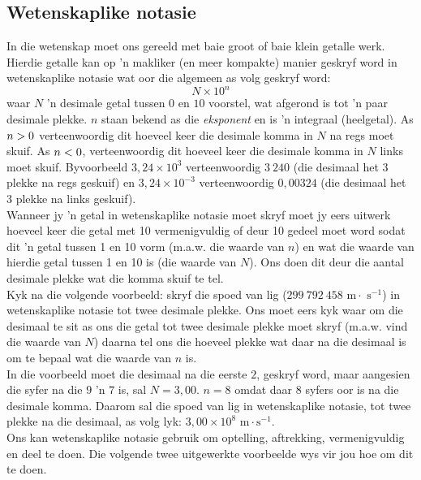 \subsection*{Wetenskaplike notasie}
In die wetenskap moet ons gereeld met baie groot of baie klein getalle werk. Hierdie getalle kan op  'n makliker (en meer kompakte) manier geskryf word in wetenskaplike notasie wat oor die algemeen as volg geskryf word:      
    \begin{equation*}
    N \times 10^{n}
      \end{equation*}
waar $N$  'n desimale getal tussen $0$ en $10$ voorstel, wat afgerond is tot  'n paar desimale plekke. $n$ staan bekend as die \textsl{eksponent} en is  'n integraal (heelgetal). As $n>{}0$ verteenwoordig dit hoeveel keer die desimale komma in $N$ na regs moet skuif. As $n<{}0$, verteenwoordig dit hoeveel keer die desimale komma in $N$ links moet skuif. Byvoorbeeld $3,24\ensuremath{\times}{10}^{3}$ verteenwoordig $3~240$ (die desimaal het 3 plekke na regs geskuif) en $3,24\ensuremath{\times}{10}^{-3}$ verteenwoordig $0,00324$ (die desimaal het 3 plekke na links geskuif).\\
Wanneer jy  'n getal in wetenskaplike notasie moet skryf moet jy eers uitwerk hoeveel keer die getal met 10 vermenigvuldig of deur 10 gedeel moet word sodat dit  'n getal tussen 1 en 10 vorm (m.a.w. die waarde van $n$) en wat die waarde van hierdie getal tussen 1 en 10 is (die waarde van $N$). Ons doen dit deur die aantal desimale plekke wat die komma skuif te tel.\\
Kyk na die volgende voorbeeld: skryf die spoed van lig ($299 ~792 ~458 \text{ m} \cdot \text{ s}^{-1}$) in wetenskaplike notasie tot twee desimale plekke. Ons moet eers kyk waar om die desimaal te sit as ons die getal tot twee desimale plekke moet skryf (m.a.w. vind die waarde van $N$) daarna tel ons die hoeveel plekke wat daar na die desimaal is om te bepaal wat die waarde van $n$ is.\\
In die voorbeeld moet die desimaal na die eerste $2$, geskryf word, maar aangesien die syfer na die $9$ 'n $7$ is, sal $N=3,00$. $n=8$ omdat daar $8$ syfers oor is na die desimale komma. Daarom sal die spoed van lig in wetenskaplike notasie, tot twee plekke na die desimaal, as volg lyk: $3,00 \times 10^{8} \text{ m} \cdot \text{s}^{-1}$. \\
Ons kan wetenskaplike notasie gebruik om optelling, aftrekking, vermenigvuldig en deel te doen. Die volgende twee uitgewerkte voorbeelde wys vir jou hoe om dit te doen.
